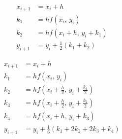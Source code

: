 \documentclass[a4j,titlepage]{jsarticle}
\begin{document}
\begin{equation}
  \begin{aligned}
    x_{i+1} &= x_i + h \\
    k_1 &= h f(x_i, \, y_i) \\
    k_2 &= h f(x_i + h, \, y_i + k_1) \\
    y_{i+1} &= y_i + \frac{1}{2} (k_1 + k_2)
  \end{aligned}
  \label{eq:heun}
\end{equation}

\begin{equation}
  \begin{aligned}
    x_{i+1} &= x_i + h \\
    k_1 &= h f(x_i, \, y_i) \\
    k_2 &= h f(x_i + \frac{h}{2}, \, y_i + \frac{k_1}{2}) \\
    k_3 &= h f(x_i + \frac{h}{2}, \, y_i + \frac{k_2}{2}) \\
    k_4 &= h f(x_i + h, \, y_i + k_3) \\
    y_{i+1} &= y_i + \frac{1}{6} (k_1 + 2 k_2 + 2 k_3 + k_4)
  \end{aligned}
  \label{eq:runge}
\end{equation}


\end{document}
